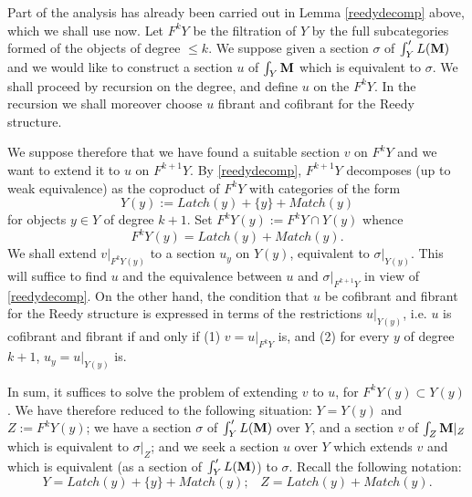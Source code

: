Part of the analysis has already been carried out in Lemma
\ref{reedydecomp} above, which we shall use now. Let $F^kY$ be the
filtration of $Y$ by
the full subcategories formed of the objects of degree $\leq k$. We
suppose given a section $\sigma$ of $\int '_YL({\bf M} )$ and we would like to
construct a section $u$ of $\int _Y{\bf M}$ which is equivalent to $\sigma$.
We shall proceed by recursion on the degree,
and define $u$ on the
$F^kY$.
In the recursion we shall moreover choose $u$ fibrant and cofibrant for the
Reedy structure.

We suppose
therefore that we have found a suitable section $v$ on $F^kY$ and we want
to extend it to $u$ on $F^{k+1}Y$.
By \ref{reedydecomp}, $F^{k+1}Y$ decomposes (up to weak equivalence)
as the coproduct of $F^kY$
with categories of the form
$$
Y(y):= Latch (y) + \{ y\} + Match (y)
$$
for objects $y\in Y$ of degree $k+1$.
Set $F^kY(y):= F^kY\cap Y(y)$ whence
$$
F^kY(y)= Latch (y)  + Match (y).
$$
We shall extend $v|_{F^kY(y)}$ to a section $u_y$ on $Y(y)$,
equivalent to $\sigma |_{Y(y)}$. This will suffice to find $u$ and
the equivalence between $u$ and $\sigma |_{F^{k+1}Y}$ in view of
\ref{reedydecomp}.
On the other hand, the condition that $u$ be cofibrant and fibrant for the
Reedy structure is expressed in terms of the restrictions $u|_{Y(y)}$, i.e.
$u$ is cofibrant and fibrant if and only if (1) $v= u|_{F^kY}$ is, and
(2) for every $y$ of degree $k+1$, $u_y= u|_{Y(y)}$ is.

In sum, it suffices
to solve the problem of extending $v$ to $u$, for $F^kY(y) \subset
Y(y)$.
We have therefore reduced to the following situation: $Y=Y(y)$ and
$Z:= F^kY(y)$;
we have a section $\sigma$ of $\int '_YL({\bf M} )$ over $Y$, and a section
$v$ of $\int _Z{\bf M} |_Z$ which is equivalent to $\sigma |_Z$; and we
seek a section $u$ over $Y$ which extends $v$ and which is equivalent
(as a section of $\int '_YL({\bf M} )$) to $\sigma$.
Recall the following notation:
$$
Y= Latch (y) + \{ y\} + Match (y);\;\;\;
Z= Latch (y) + Match (y).
$$

